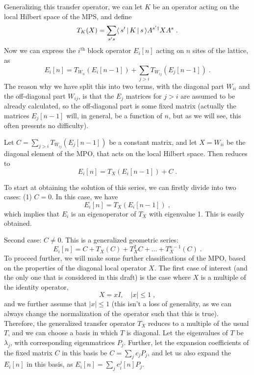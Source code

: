 \documentclass{article}[10pt]
\begin{document}
Generalizing this transfer operator, we can let $K$ be an operator acting on
the local Hilbert space of the MPS, and define
\begin{equation}
T_K(X) = \sum_{s's} \langle \, s' \, | \, K \, | \, s \, \rangle A^{s'\dagger} X A^s \; .
\end{equation}
Now we can express the $i^{\mathrm{th}}$ block operator $E_i[n]$ acting on
$n$ sites of the lattice, as
\begin{equation}
E_i[n] = T_{W_{ii}}(E_i[n-1]) + \sum_{j>i} T_{W_{ij}}(E_j[n-1]) \; .
\label{eq:MPORecurrence}
\end{equation}
The reason why we have split this into two terms, with the diagonal part $W_{ii}$
and the off-diagonal part $W_{ij}$, is that the $E_j$ matrices for $j>i$ are assumed to be
already calculated, so the off-diagonal part is some fixed matrix (actually
the matrices $E_j[n-1]$ will, in general, be a function of $n$, but as we will
see, this often presents no difficulty).

Let $C = \sum_{j>i} T_{W_{ij}}(E_j[n-1])$ be a constant matrix, and 
let $X = W_{ii}$ be the diagonal element of the MPO, that acts on the
local Hilbert space. Then 
 reduces to
\begin{equation}
E_i[n] = T_{X}(E_i[n-1]) + C \; .
\label{eq:MPORecurrenceNicer}
\end{equation}

To start at obtaining the solution of this series, we can firstly
divide into two cases: (1) $C=0$. In this case, we have
\begin{equation}
E_i[n] = T_{X}(E_i[n-1]) \; ,
\end{equation}
which implies that $E_i$ is an eigenoperator of $T_X$ with eigenvalue 1. 
This is easily obtained.

Second case: $C \neq 0$. This is a generalized geometric series:
\begin{equation}
E_i[n] = C + T_X(C) + T^2_X{C} + \ldots + T^{n-1}_X(C) \; .
\end{equation}
To proceed further, we will make some further classifications of the MPO,
based on the properties of the diagonal local operator $X$. The first case
of interest (and the only one that is considered in this draft) is
the case where $X$ is a multiple of the identity operator, 
\begin{equation}
X = xI, \quad |x| \leq 1 \; ,
\end{equation}
and we further assume that $|x| \leq 1$ (this isn't a loss of generality, as we
can always change the normalization of the operator such that this is true).
Therefore, the generalized transfer operator $T_X$ reduces to a multiple of the
usual $T$, and we can choose a basis in which
$T$ is diagonal. Let the eigenvalues of $T$ be $\lambda_j$,
with corresponding eigenmatrices $P_j$.
Further, let the expansion coefficients of the fixed matrix $C$ in this basis
be $C = \sum_j c_j P_j$, and let us also expand the $E_i[n]$ in this basis,
as $E_i[n] = \sum_j e^j_i[n] P_j$.
\end{document}
